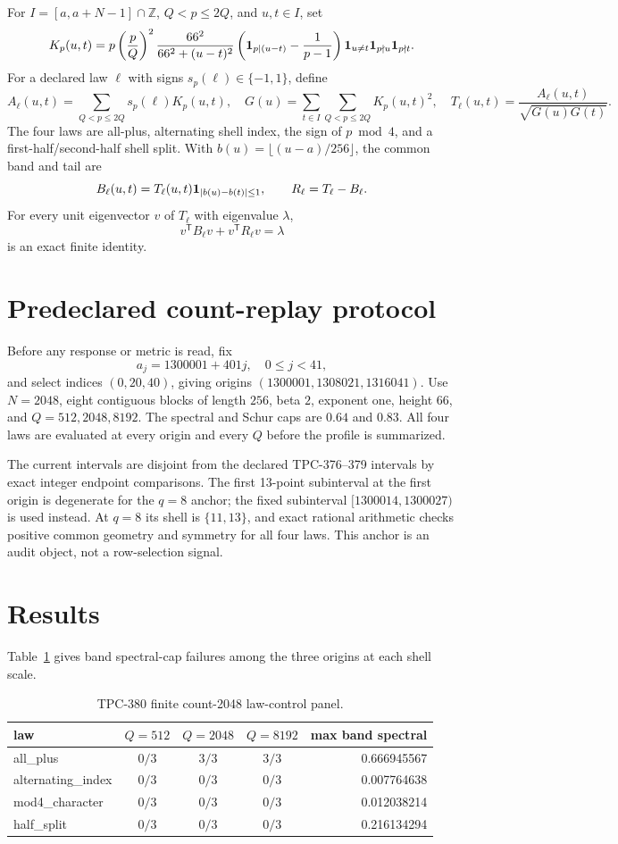 \documentclass[10pt]{article}
\begin{document}
For $I=[a,a+N-1]\cap\mathbb Z$, $Q<p\leq2Q$, and $u,t\in I$, set
\[
 K_p(u,t)=p\left(\frac pQ\right)^2
 \frac{66^2}{66^2+(u-t)^2}
 \left({\bf1}_{p\mid(u-t)}-\frac1{p-1}\right)
 {\bf1}_{u\ne t}{\bf1}_{p\nmid u}{\bf1}_{p\nmid t}.
\]
For a declared law $\ell$ with signs $s_p(\ell)\in\{-1,1\}$, define
\[
 A_\ell(u,t)=\sum_{Q<p\leq2Q}s_p(\ell)K_p(u,t),\quad
 G(u)=\sum_{t\in I}\sum_{Q<p\leq2Q}K_p(u,t)^2,
 \quad T_\ell(u,t)=\frac{A_\ell(u,t)}{\sqrt{G(u)G(t)}}.
\]
The four laws are all-plus, alternating shell index, the sign of $p\bmod4$,
and a first-half/second-half shell split.  With
$b(u)=\lfloor(u-a)/256\rfloor$, the common band and tail are
\[
 B_\ell(u,t)=T_\ell(u,t){\bf1}_{|b(u)-b(t)|\leq1},\qquad
 R_\ell=T_\ell-B_\ell.
\]
For every unit eigenvector $v$ of $T_\ell$ with eigenvalue $\lambda$,
\[
 v^{\mathsf T}B_\ell v+v^{\mathsf T}R_\ell v=\lambda
\]
is an exact finite identity.

\section{Predeclared count-replay protocol}

Before any response or metric is read, fix
\[
 a_j=1300001+401j,\quad 0\leq j<41,
\]
and select indices $(0,20,40)$, giving origins
$(1300001,1308021,1316041)$.  Use $N=2048$, eight contiguous blocks of
length $256$, beta $2$, exponent one, height $66$, and $Q=512,2048,8192$.
The spectral and Schur caps are $0.64$ and $0.83$.  All four laws are
evaluated at every origin and every $Q$ before the profile is summarized.

The current intervals are disjoint from the declared TPC-376--379 intervals
by exact integer endpoint comparisons.  The first 13-point subinterval at the
first origin is degenerate for the $q=8$ anchor; the fixed subinterval
$[1300014,1300027)$ is used instead.  At $q=8$ its shell is $\{11,13\}$,
and exact rational arithmetic checks positive common geometry and symmetry for
all four laws.  This anchor is an audit object, not a row-selection signal.

\section{Results}

Table~\ref{tab:count} gives band spectral-cap failures among the three origins
at each shell scale.

\begin{table}[ht]
\centering
\caption{TPC-380 finite count-2048 law-control panel.}
\label{tab:count}
\scriptsize
\begin{tabular}{l c c c r}
\toprule
law & $Q=512$ & $Q=2048$ & $Q=8192$ & max band spectral\\
\midrule
all\_plus & $0/3$ & $3/3$ & $3/3$ & 0.666945567\\
alternating\_index & $0/3$ & $0/3$ & $0/3$ & 0.007764638\\
mod4\_character & $0/3$ & $0/3$ & $0/3$ & 0.012038214\\
half\_split & $0/3$ & $0/3$ & $0/3$ & 0.216134294\\
\bottomrule
\end{tabular}
\end{table}
\end{document}
